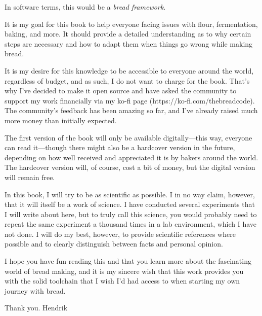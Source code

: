 In software terms, this would be a {\it bread framework}.

It is my goal for this book to help everyone facing issues with flour, fermentation, baking,
and more. It should provide a detailed understanding as to why certain steps are necessary
and how to adapt them when things go wrong while making bread.

It is my desire for this knowledge to be accessible to everyone around the world, regardless
of budget, and as such, I do not want to charge for the book. That's why I've decided to make
it open source and have asked the community to support my work financially via my ko-fi page
(https://ko-fi.com/thebreadcode). The community's feedback has been amazing so far, and
I've already raised much more money than initially expected.

The first version of the book will only be available digitally---this way, everyone can read
it---though there might also be a hardcover version in the future, depending on how well received
and appreciated it is by bakers around the world. The hardcover version will, of course, cost a
bit of money, but the digital version will remain free.

In this book, I will try to be as scientific as possible. I in no way claim, however, that
it will itself be a work of science. I have conducted several experiments that I will write
about here, but to truly call this science, you would probably need to repeat the same experiment
a thousand times in a lab environment, which I have not done. I will do my best, however, to provide
scientific references where possible and to clearly distinguish between facts and personal opinion.

I hope you have fun reading this and that you learn more about the fascinating world of bread
making, and it is my sincere wish that this work provides you with the solid toolchain that I wish
I'd had access to when starting my own journey with bread.

Thank you.
Hendrik
